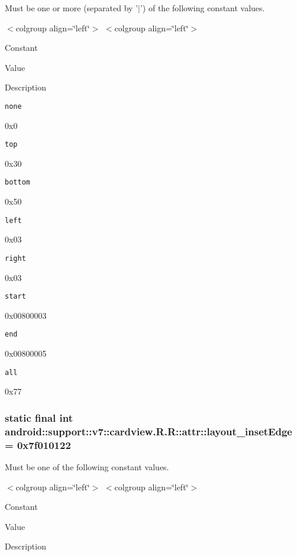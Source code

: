 Must be one or more (separated by '$|$') of the following constant values. \begin{TabularC}{0}
\hline
\end{TabularC}
$<$colgroup align=\char`\"{}left\char`\"{}$>$ $<$colgroup align=\char`\"{}left\char`\"{}$>$ 

Constant

Value

Description 

{\tt none}

0x0

{\tt top}

0x30

{\tt bottom}

0x50

{\tt left}

0x03

{\tt right}

0x03

{\tt start}

0x00800003

{\tt end}

0x00800005

{\tt all}

0x77\hypertarget{classandroid_1_1support_1_1v7_1_1cardview_1_1_r_1_1attr_5f28088a362144ee13650b4b7cd89e77}{
\subsubsection[{layout\_\-insetEdge}]{\setlength{\rightskip}{0pt plus 5cm}static final int android::support::v7::cardview.R.R::attr::layout\_\-insetEdge = 0x7f010122}}
\label{classandroid_1_1support_1_1v7_1_1cardview_1_1_r_1_1attr_5f28088a362144ee13650b4b7cd89e77}


Must be one of the following constant values. \begin{TabularC}{0}
\hline
\end{TabularC}
$<$colgroup align=\char`\"{}left\char`\"{}$>$ $<$colgroup align=\char`\"{}left\char`\"{}$>$ 

Constant

Value

Description 

